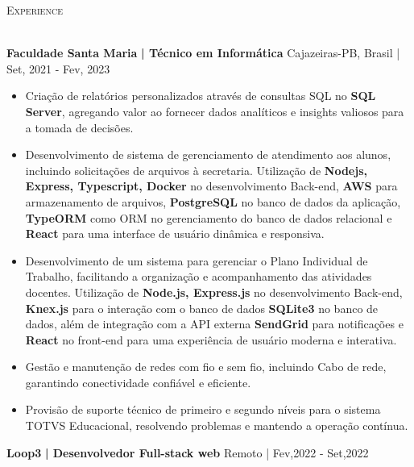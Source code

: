 \documentclass[a4paper]{article}
\newcommand{\lineunder} {
    \vspace*{-8pt} \\
    \hspace*{-18pt} \hrulefill \\
}
\newcommand{\header} [1] {
    {\hspace*{-18pt}\vspace*{6pt} \textsc{#1}}
    \vspace*{-6pt} \lineunder
}
\begin{document}
%
%
\header{Experience}
\vspace{2mm}

\textbf{Faculdade Santa Maria}\textbf{ | Técnico em Informática} \hfill Cajazeiras-PB, Brasil | Set, 2021 - Fev, 2023\\
\vspace{-3mm}
\begin{itemize} \itemsep -3pt
    \item  Criação de relatórios personalizados através de consultas SQL no \textbf{SQL Server}, agregando valor ao fornecer dados analíticos e insights valiosos para a tomada de decisões.
    \item  Desenvolvimento de sistema de gerenciamento de atendimento aos alunos, incluindo solicitações de arquivos à secretaria. Utilização de \textbf{Nodejs, Express, Typescript, Docker} no desenvolvimento Back-end,
          \textbf{AWS} para armazenamento de arquivos, \textbf{PostgreSQL} no banco de dados da aplicação, \textbf{TypeORM} como ORM no gerenciamento do banco de dados relacional e \textbf{React} para uma interface de usuário dinâmica e responsiva.
    \item  Desenvolvimento de um sistema para gerenciar o Plano Individual de Trabalho, facilitando a organização e acompanhamento das atividades docentes. Utilização de \textbf{Node.js, Express.js} no desenvolvimento Back-end,
          \textbf{Knex.js} para o interação com o banco de dados \textbf{SQLite3} no banco de dados, além de integração com a API externa \textbf{SendGrid} para notificações e \textbf{React} no front-end para uma experiência
          de usuário moderna e interativa.
    \item  Gestão e manutenção de redes com fio e sem fio, incluindo Cabo de rede, garantindo conectividade confiável e eficiente.
    \item  Provisão de suporte técnico de primeiro e segundo níveis para o sistema TOTVS Educacional, resolvendo problemas e mantendo a operação contínua.
\end{itemize}
\textbf{Loop3}\textbf{ | Desenvolvedor Full-stack web} \hfill Remoto | Fev,2022 - Set,2022\\
\vspace{-3mm}
\end{document}
